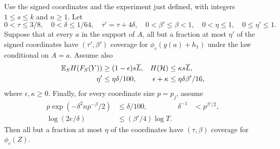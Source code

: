 \begin{theorem}\label{thm:transfer}
Use the signed coordinates and the experiment just defined, with
integers $1\le s\le k$ and $n\ge1$. Let
\[
 0<\tau\le3/8,\quad 0<\delta\le1/64,\quad
 \tau'=\tau+4\delta,\quad 0<\beta'\le\beta<1,
 \quad 0<\eta\le1,\quad 0\le\eta'\le1.
\]
Suppose that at every $a$ in the support of $A$, all but a fraction at
most $\eta'$ of the signed coordinates have $(\tau',\beta')$ coverage
for $\phi_c(y(a)+h_1)$ under the law conditional on $A=a$.
Assume also
\begin{align}
 \mathbb E_S H(F_S(Y))&\ge(1-\epsilon)s\overline L,
 &H(\mathcal H)&\le\kappa s\overline L,\label{eq:transfer-entropy}\\
 \eta'&\le\eta\delta/100,
 &\epsilon+\kappa&\le\eta\delta\beta'/16,\label{eq:transfer-budget}
\end{align}
where $\epsilon,\kappa\ge0$. Finally, for every coordinate size $p=p_j$,
assume
\begin{align}
 p\exp(-\delta^2np^{-\beta}/2)&\le\delta/100,
 &\delta^{-1}&<p^{\beta'/2},\label{eq:transfer-size}\\
 \log(2e/\delta)&\le(\beta'/4)\log T.\label{eq:transfer-log}
\end{align}
Then all but a fraction at most $\eta$ of the coordinates have
$(\tau,\beta)$ coverage for $\phi_c(Z)$.
\end{theorem}

